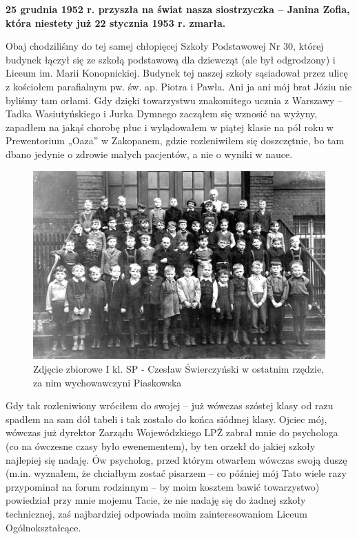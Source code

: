 \textbf{25 grudnia 1952 r. przyszła na świat nasza siostrzyczka – Janina Zofia, która niestety już 22 stycznia 1953 r. zmarła.}

Obaj chodziliśmy do tej samej chłopięcej Szkoły Podstawowej Nr 30, której budynek łączył się ze szkołą podstawową dla dziewcząt (ale był odgrodzony) i Liceum im. Marii Konopnickiej. Budynek tej naszej szkoły sąsiadował przez ulicę z kościołem parafialnym pw. św. ap. Piotra i Pawła. Ani ja ani mój brat Józiu nie byliśmy tam orłami. Gdy dzięki towarzystwu znakomitego ucznia z Warszawy – Tadka Wasiutyńskiego i Jurka Dymnego zacząłem się wznosić na wyżyny, zapadłem na jakąś chorobę płuc i wylądowałem w piątej klasie na pół roku w Prewentorium „Oaza” w Zakopanem, gdzie rozleniwiłem się doszczętnie, bo tam dbano jedynie o zdrowie małych pacjentów, a nie o wyniki w nauce.
\begin{figure}[!h]
\begin{center}
\includegraphics[width=\textwidth]{photo/czeslaw_swierczynski_i_kl_sp.jpg}
\caption[Zdjęcie zbiorowe I kl. SP]{Zdjęcie zbiorowe I kl. SP - Czesław Świerczyński w ostatnim rzędzie, za nim wychowawczyni Piaskowska}
\end{center}
\end{figure}

Gdy tak rozleniwiony wróciłem do swojej – już wówczas szóstej klasy od razu spadłem na sam dół tabeli i tak zostało do końca siódmej klasy. Ojciec mój, wówczas już dyrektor Zarządu Wojewódzkiego LPŻ zabrał mnie do psychologa (co na ówczesne czasy było ewenementem), by ten orzekł do jakiej szkoły najlepiej się nadaję. Ów psycholog, przed którym otwarłem wówczas swoją duszę (m.in. wyznałem, że chciałbym zostać pisarzem – co później mój Tato wiele razy przypominał na forum rodzinnym – by moim kosztem bawić towarzystwo) powiedział przy mnie mojemu Tacie, że nie nadaję się do żadnej szkoły technicznej, zaś najbardziej odpowiada moim zainteresowaniom Liceum Ogólnokształcące. 

